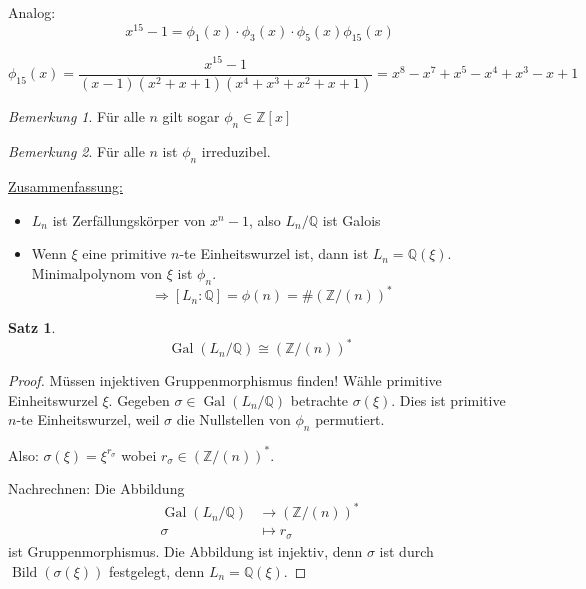 \documentclass[12pt,parskip=full]{scrartcl}
\newcommand{\setZ}{\mathbb{Z}}
\newcommand{\setQ}{\mathbb{Q}}
\newcommand{\heading}{\underline}
\DeclareMathOperator{\Gal}{Gal}
\theoremstyle{definition}
\newtheorem{theorem}{Satz}[section]
\theoremstyle{remark}
\newtheorem*{remark}{Bemerkung}
\begin{document}
	Analog:
	\begin{equation*}
		x^{15} - 1 = \phi_1(x) \cdot \phi_3(x) \cdot \phi_5(x) \phi_{15}(x)
	\end{equation*}
	
	\begin{equation*}
		\phi_{15}(x) = \frac{x^{15} - 1}{(x-1)(x^2 + x + 1)(x^4 + x^3 + x^2 + x + 1)} = x^8 - x^7 + x^5 - x^4 + x^3 - x + 1
	\end{equation*}
	
	\begin{remark}
		Für alle $n$ gilt sogar $\phi_n \in \setZ[x]$
	\end{remark}

	\begin{remark}
		Für alle $n$ ist $\phi_n$ irreduzibel.
	\end{remark}

	\heading{Zusammenfassung:}
	\begin{itemize}
		\item $L_n$ ist Zerfällungskörper von $x^n - 1$, also $L_n/\setQ$ ist Galois
		\item Wenn $\xi$ eine primitive $n$-te Einheitswurzel ist, dann ist $L_n = \setQ(\xi)$. Minimalpolynom von $\xi$ ist $\phi_n$.
		\begin{equation*}
			\Rightarrow [L_n: \setQ] = \phi(n) = \# (\setZ/(n))^*
		\end{equation*}
	\end{itemize}

	\begin{theorem}
		\begin{equation*}
			\Gal(L_n/\setQ) \cong (\setZ/(n))^*
		\end{equation*}
	\end{theorem}

	\begin{proof}
		Müssen injektiven Gruppenmorphismus finden! Wähle primitive Einheitswurzel $\xi$. Gegeben $\sigma \in \Gal(L_n/\setQ)$ betrachte $\sigma(\xi)$. Dies ist primitive $n$-te Einheitswurzel, weil $\sigma$ die Nullstellen von $\phi_n$ permutiert.
		
		Also: $\sigma(\xi) = \xi^{r_\sigma}$ wobei $r_\sigma \in (\setZ/(n))^*$.
		
		Nachrechnen: Die Abbildung
		\begin{align*}
			\Gal(L_n/\setQ) &\longrightarrow (\setZ/(n))^* \\
			\sigma &\longmapsto r_\sigma
		\end{align*}
		ist Gruppenmorphismus. Die Abbildung ist injektiv, denn $\sigma$ ist durch $\operatorname{Bild}(\sigma(\xi))$ festgelegt, denn $L_n = \setQ(\xi)$.
	\end{proof}
\end{document}

